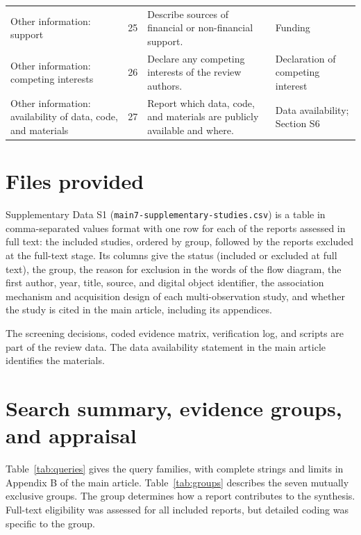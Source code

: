 \documentclass[a4paper,11pt]{article}
\begin{document}
\begin{footnotesize}
\begin{longtable}{@{}L{3.0cm}L{0.8cm}L{6.4cm}L{\dimexpr\linewidth-10.2cm-6\tabcolsep\relax}@{}}
Other information: support & 25 & Describe sources of financial or non-financial support. & Funding\\
Other information: competing interests & 26 & Declare any competing interests of the review authors. & Declaration of competing interest\\
Other information: availability of data, code, and materials & 27 & Report which data, code, and materials are publicly available and where. & Data availability; Section S6\\
\end{longtable}
\end{footnotesize}

\section{Files provided}\label{sup:files}

Supplementary Data S1 (\texttt{main7-supplementary-studies.csv}) is a table in comma-separated values format with one row for each of the \nFTAssessed reports assessed in full text: the \nIncluded included studies, ordered by group, followed by the \nFTExcl reports excluded at the full-text stage. Its columns give the status (included or excluded at full text), the group, the reason for exclusion in the words of the flow diagram, the first author, year, title, source, and digital object identifier, the association mechanism and acquisition design of each multi-observation study, and whether the study is cited in the main article, including its appendices.

The screening decisions, coded evidence matrix, verification log, and scripts are part of the review data. The data availability statement in the main article identifies the materials.

\section{Search summary, evidence groups, and appraisal}\label{sup:appraisal}
Table~\ref{tab:queries} gives the query families, with complete strings and limits in Appendix B of the main article. Table~\ref{tab:groups} describes the seven mutually exclusive groups. The group determines how a report contributes to the synthesis. Full-text eligibility was assessed for all included reports, but detailed coding was specific to the group.
\end{document}
